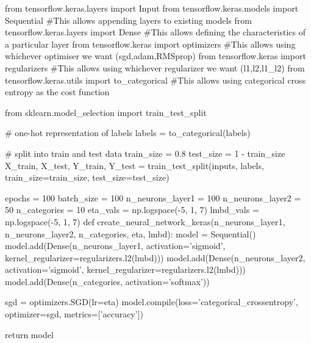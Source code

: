 \documentclass[%
oneside,                 %
final,                   %
10pt]{article}
\begin{document}
\bpycod
from tensorflow.keras.layers import Input
from tensorflow.keras.models import Sequential      #This allows appending layers to existing models
from tensorflow.keras.layers import Dense           #This allows defining the characteristics of a particular layer
from tensorflow.keras import optimizers             #This allows using whichever optimiser we want (sgd,adam,RMSprop)
from tensorflow.keras import regularizers           #This allows using whichever regularizer we want (l1,l2,l1_l2)
from tensorflow.keras.utils import to_categorical   #This allows using categorical cross entropy as the cost function

from sklearn.model_selection import train_test_split

# one-hot representation of labels
labels = to_categorical(labels)

# split into train and test data
train_size = 0.8
test_size = 1 - train_size
X_train, X_test, Y_train, Y_test = train_test_split(inputs, labels, train_size=train_size,
                                                    test_size=test_size)

\epycod





















\bpycod

epochs = 100
batch_size = 100
n_neurons_layer1 = 100
n_neurons_layer2 = 50
n_categories = 10
eta_vals = np.logspace(-5, 1, 7)
lmbd_vals = np.logspace(-5, 1, 7)
def create_neural_network_keras(n_neurons_layer1, n_neurons_layer2, n_categories, eta, lmbd):
    model = Sequential()
    model.add(Dense(n_neurons_layer1, activation='sigmoid', kernel_regularizer=regularizers.l2(lmbd)))
    model.add(Dense(n_neurons_layer2, activation='sigmoid', kernel_regularizer=regularizers.l2(lmbd)))
    model.add(Dense(n_categories, activation='softmax'))
    
    sgd = optimizers.SGD(lr=eta)
    model.compile(loss='categorical_crossentropy', optimizer=sgd, metrics=['accuracy'])
    
    return model

\epycod
\end{document}
